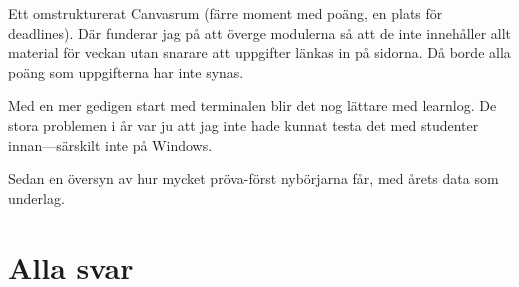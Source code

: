 \documentclass[a4paper]{article}
\begin{document}
\begin{refsection}
Ett omstrukturerat Canvasrum (färre moment med poäng, en plats för
deadlines).
Där funderar jag på att överge modulerna så att de inte innehåller allt 
material för veckan utan snarare att uppgifter länkas in på sidorna.
Då borde alla poäng som uppgifterna har inte synas.

Med en mer gedigen start med terminalen blir det nog lättare med learnlog.
De stora problemen i år var ju att jag inte hade kunnat testa det med studenter 
innan---särskilt inte på Windows.

Sedan en översyn av hur mycket pröva-först nybörjarna får, med årets data som 
underlag.

\printbibliography[heading=bibintoc,title={Referenser}]
\end{refsection}

\appendix

\section{Alla svar}
{
  \let\subsubsection\subsection
  \let\subsection\subsubsection
  \let\section\subsection
  
}

\clearpage
\end{document}
